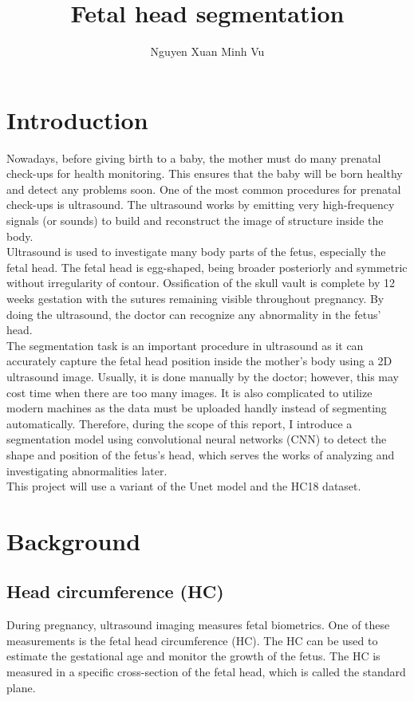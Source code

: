 \documentclass[conference]{article}
\title{Fetal head segmentation}
\author{Nguyen Xuan Minh Vu}
\begin{document}
\maketitle

\section{Introduction}

Nowadays, before giving birth to a baby, the mother must do many prenatal check-ups for health monitoring. This ensures that the baby will be born healthy and detect any problems soon. One of the most common procedures for prenatal check-ups is ultrasound. The ultrasound works by emitting very high-frequency signals (or sounds) to build and reconstruct the image of structure inside the body.\\
Ultrasound is used to investigate many body parts of the fetus, especially the fetal head. The fetal head is egg-shaped, being broader posteriorly and symmetric without irregularity of contour. Ossification of the skull vault is complete by 12 weeks gestation with the sutures remaining visible throughout pregnancy. By doing the ultrasound, the doctor can recognize any abnormality in the fetus' head.\\
The segmentation task is an important procedure in ultrasound as it can accurately capture the fetal head position inside the mother's body using a 2D ultrasound image. Usually, it is done manually by the doctor; however, this may cost time when there are too many images. It is also complicated to utilize modern machines as the data must be uploaded handly instead of segmenting automatically. Therefore, during the scope of this report, I introduce a segmentation model using convolutional neural networks (CNN) to detect the shape and position of the fetus's head, which serves the works of analyzing and investigating abnormalities later.\\
This project will use a variant of the Unet model and the HC18 dataset.

\section{Background}
\subsection{Head circumference (HC)} During pregnancy, ultrasound imaging measures fetal biometrics. One of these measurements is the fetal head circumference (HC). The HC can be used to estimate the gestational age and monitor the growth of the fetus. The HC is measured in a specific cross-section of the fetal head, which is called the standard plane.
\end{document}
